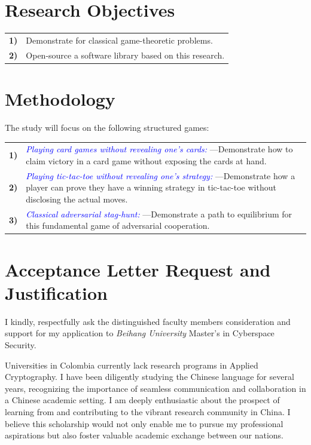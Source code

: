 \documentclass[conference]{IEEEtran}
\begin{document}
\vspace{5pt}
\section{Research Objectives}

\begin{tabular}{lp{210pt}}
    {\small \textbf{1)}} & {\small Demonstrate for classical game-theoretic problems.} \\
    {\small \textbf{2)}} & {\small Open-source a software library based on this research.} 
\end{tabular}

\section{Methodology}
\vspace{5pt}
The study will focus on the following structured games:
\vspace{5pt}

\begin{tabular}{lp{210pt}}
    {\small \textbf{1)}} & {\textcolor{blue}{\textit{Playing card games without revealing one's cards:}} \linebreak---Demonstrate how to claim victory in a card game without exposing the cards at hand. } \\
    {\small \textbf{2)}} & {\textcolor{blue}{\textit{Playing tic-tac-toe without revealing one's strategy:}} \linebreak---Demonstrate how a player can prove they have a winning strategy in tic-tac-toe without disclosing the actual moves. } \\
    {\small \textbf{3)}} & {\textcolor{blue}{\textit{Classical adversarial stag-hunt:}} ---Demonstrate a path to equilibrium for this fundamental game of adversarial cooperation. } 
\end{tabular}

\section{Acceptance Letter Request and Justification}
I kindly, respectfully ask the distinguished faculty members consideration and support for my application to \textit{Beihang University} Master's in Cyberspace Security. 

Universities in Colombia currently lack research programs in Applied Cryptography. I have been diligently studying the Chinese language for several years, 
recognizing the importance of seamless communication and collaboration in a Chinese academic setting. 
I am deeply enthusiastic about the prospect of learning from and contributing to the vibrant research community in China. 
I believe this scholarship would not only enable me to pursue my professional aspirations but also foster valuable academic exchange between our nations.
\end{document}
